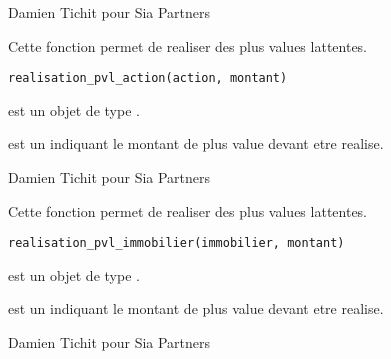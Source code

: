 \documentclass[a4paper]{book}
\begin{document}
\begin{Author}\relax
Damien Tichit pour Sia Partners
\end{Author}
%
\begin{Description}\relax
Cette fonction permet de realiser des plus values lattentes.
\end{Description}
%
\begin{Usage}
\begin{verbatim}
realisation_pvl_action(action, montant)
\end{verbatim}
\end{Usage}
%
\begin{Arguments}
\begin{ldescription}
\item[\code{action}] est un objet de type .

\item[\code{montant}] est un  indiquant le montant de plus value devant etre realise.
\end{ldescription}
\end{Arguments}
%
\begin{Author}\relax
Damien Tichit pour Sia Partners
\end{Author}
%
\begin{Description}\relax
Cette fonction permet de realiser des plus values lattentes.
\end{Description}
%
\begin{Usage}
\begin{verbatim}
realisation_pvl_immobilier(immobilier, montant)
\end{verbatim}
\end{Usage}
%
\begin{Arguments}
\begin{ldescription}
\item[\code{immobilier}] est un objet de type .

\item[\code{montant}] est un  indiquant le montant de plus value devant etre realise.
\end{ldescription}
\end{Arguments}
%
\begin{Author}\relax
Damien Tichit pour Sia Partners
\end{Author}
\end{document}
